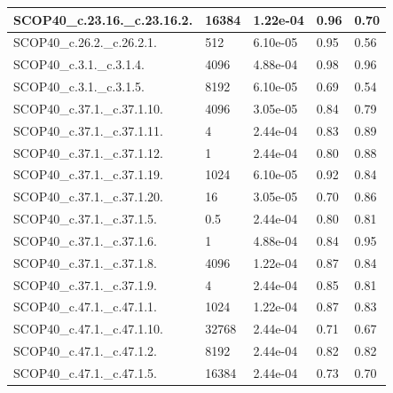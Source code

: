 \documentclass[11pt]{article}
\begin{document}
\begin{longtable}{|p{}|p{}|p{}|p{}|p{}|}
	SCOP40\_c.23.16.\_c.23.16.2.  & 16384   & 1.22e-04  & 0.96  & 0.70 \\ \hline
	
	SCOP40\_c.26.2.\_c.26.2.1.    & 512     & 6.10e-05  & 0.95  & 0.56 \\ \hline
	
	SCOP40\_c.3.1.\_c.3.1.4.      & 4096    & 4.88e-04  & 0.98  & 0.96 \\ \hline
	
	SCOP40\_c.3.1.\_c.3.1.5.      & 8192    & 6.10e-05  & 0.69  & 0.54 \\ \hline
	
	SCOP40\_c.37.1.\_c.37.1.10.   & 4096    & 3.05e-05  & 0.84  & 0.79 \\ \hline
	
	SCOP40\_c.37.1.\_c.37.1.11.   & 4       & 2.44e-04  & 0.83  & 0.89 \\ \hline
	
	SCOP40\_c.37.1.\_c.37.1.12.   & 1       & 2.44e-04  & 0.80  & 0.88 \\ \hline
	
	SCOP40\_c.37.1.\_c.37.1.19.   & 1024    & 6.10e-05  & 0.92  & 0.84 \\ \hline
	
	SCOP40\_c.37.1.\_c.37.1.20.   & 16      & 3.05e-05  & 0.70  & 0.86 \\ \hline
	
	SCOP40\_c.37.1.\_c.37.1.5.    & 0.5     & 2.44e-04  & 0.80  & 0.81 \\ \hline
	
	SCOP40\_c.37.1.\_c.37.1.6.    & 1       & 4.88e-04  & 0.84  & 0.95 \\ \hline
	
	SCOP40\_c.37.1.\_c.37.1.8.    & 4096    & 1.22e-04  & 0.87  & 0.84 \\ \hline
	
	SCOP40\_c.37.1.\_c.37.1.9.    & 4       & 2.44e-04  & 0.85  & 0.81 \\ \hline
	
	SCOP40\_c.47.1.\_c.47.1.1.    & 1024    & 1.22e-04  & 0.87  & 0.83 \\ \hline
	
	SCOP40\_c.47.1.\_c.47.1.10.   & 32768   & 2.44e-04  & 0.71  & 0.67 \\ \hline
	
	SCOP40\_c.47.1.\_c.47.1.2.    & 8192    & 2.44e-04  & 0.82  & 0.82 \\ \hline
	
	SCOP40\_c.47.1.\_c.47.1.5.    & 16384   & 2.44e-04  & 0.73  & 0.70 \\ \hline
	

\end{longtable}
\end{document}

